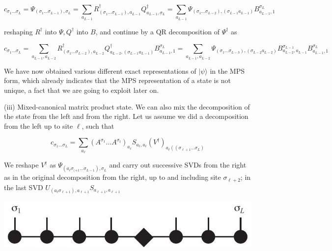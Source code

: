 \documentclass[12pt]{article}
\begin{document}
\begin{equation*}
c_{\sigma_{1} \ldots \sigma_{L}}=\Psi_{\left(\sigma_{1} \ldots \sigma_{L-1}\right), \sigma_{L}}=\sum_{a_{L-1}} R_{\left(\sigma_{1} \ldots \sigma_{L-1}\right), a_{L-1}}^{\dagger} Q_{a_{L-1}, \sigma_{L}}^{\dagger}=\sum_{a_{L-1}} \Psi_{\left(\sigma_{1} \ldots \sigma_{L-2}\right),\left(\sigma_{L-1} a_{L-1}\right)} B_{a_{L-1}, 1}^{\sigma_{L}} \tag{49}
\end{equation*}


reshaping $R^{\dagger}$ into $\Psi, Q^{\dagger}$ into $B$, and continue by a $\mathrm{QR}$ decomposition of $\Psi^{\dagger}$ as


\begin{equation*}
c_{\sigma_{1} \ldots \sigma_{L}}=\sum_{a_{L-1}, a_{L-2}} R_{\left(\sigma_{1} \ldots \sigma_{L-2}\right), a_{L-2}}^{\dagger} Q_{a_{L-2},\left(\sigma_{L-1} a_{L-1}\right)}^{\dagger} B_{a_{L-1}, 1}^{\sigma_{L}}=\sum_{a_{L-1}, a_{L-2}} \Psi_{\left(\sigma_{1} \ldots \sigma_{L-3}\right),\left(\sigma_{L-2} a_{L-2}\right)} B_{a_{L-2}, a_{L-1}}^{\sigma_{L-1}} B_{a_{L-1}, 1}^{\sigma_{L}} \tag{50}
\end{equation*}


We have now obtained various different exact representations of $|\psi\rangle$ in the MPS form, which already indicates that the MPS representation of a state is not unique, a fact that we are going to exploit later on.

(iii) Mixed-canonical matrix product state. We can also mix the decomposition of the state from the left and from the right. Let us assume we did a decomposition from the left up to site $\ell$, such that


\begin{equation*}
c_{\sigma_{1} \ldots \sigma_{L}}=\sum_{a_{\ell}}\left(A^{\sigma_{1}} \ldots A^{\sigma_{t}}\right)_{a_{\ell}} S_{a_{\ell}, a_{\ell}}\left(V^{\dagger}\right)_{a_{\ell}\left(\left(\sigma_{\ell+1} \ldots \sigma_{L}\right)\right.} \tag{51}
\end{equation*}


We reshape $V^{\dagger}$ as $\Psi_{\left(a_{\ell} \sigma_{(+1} \ldots \sigma_{L-1}\right), \sigma_{L}}$ and carry out successive SVDs from the right as in the original decomposition from the right, up to and including site $\sigma_{\ell+2}$; in the last SVD $U_{\left(a_{\ell} \sigma_{\ell+1}\right), a_{\ell+1}} S_{a_{\ell+1}, a_{\ell+1}}$

\begin{center}
\includegraphics[max width=\textwidth]{2024_05_04_afc4ad226da9ccfe0ac8g-024}
\end{center}
\end{document}
